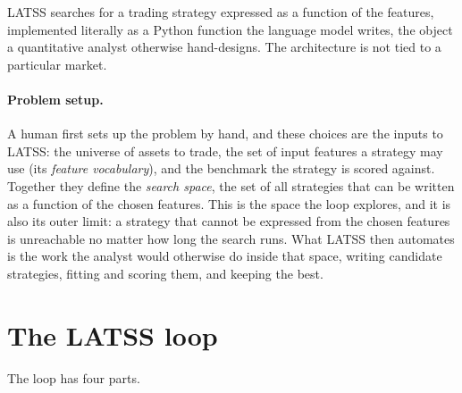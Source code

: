\documentclass[11pt]{article}
\begin{document}
LATSS searches for a trading strategy expressed as a function of the features, implemented literally as a
Python function the language model writes, the object a quantitative analyst otherwise hand-designs. The
architecture is not tied to a particular market.

\paragraph{Problem setup.} A human first sets up the
problem by hand, and these choices are the inputs to LATSS: the universe of assets to trade, the set of
input features a strategy may use (its \emph{feature vocabulary}), and the benchmark the strategy is
scored against. Together they define the \emph{search space}, the set of all strategies that can be
written as a function of the chosen features. This is the space the loop explores, and it is also its
outer limit: a strategy that cannot be expressed from the chosen features is unreachable no matter how
long the search runs. What LATSS then automates is the work the analyst would otherwise do inside that
space, writing candidate strategies, fitting and scoring them, and keeping the best.

\section{The LATSS loop}
\label{sec:loop}

The loop has four parts.
\end{document}
